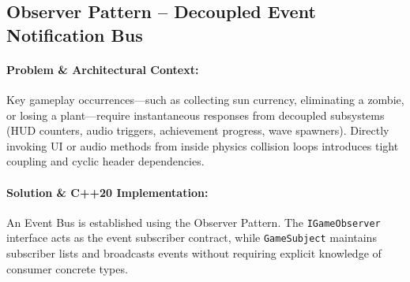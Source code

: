 \documentclass[12pt,a4paper]{article}
\begin{document}
\subsection{Observer Pattern -- Decoupled Event Notification Bus}

\paragraph{Problem \& Architectural Context:}
Key gameplay occurrences—such as collecting sun currency, eliminating a zombie, or losing a plant—require instantaneous responses from decoupled subsystems (HUD counters, audio triggers, achievement progress, wave spawners). Directly invoking UI or audio methods from inside physics collision loops introduces tight coupling and cyclic header dependencies.

\paragraph{Solution \& C++20 Implementation:}
An Event Bus is established using the Observer Pattern. The \texttt{IGameObserver} interface acts as the event subscriber contract, while \texttt{GameSubject} maintains subscriber lists and broadcasts events without requiring explicit knowledge of consumer concrete types.

\begin{center}
\end{center}
\end{document}
